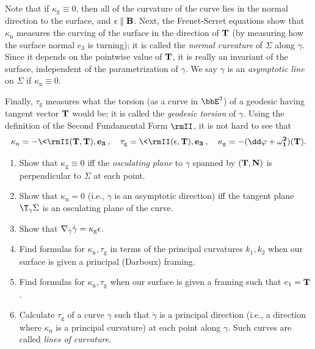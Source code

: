 Note that if $\kappa_{\mathrm{g}}\equiv 0$, then all of the curvature of the curve lies in the normal direction to the surface, and $\bf{\epsilon}\parallel \bf{B}$. Next, the Frenet-Serret equations show that $\kappa_{\mathrm{n}}$ measures the curving of the surface in the direction of $\bf{T}$ (by measuring how the surface normal $e_3$ is turning); it is called the \emph{normal curvature} of $\Sigma$ along $\gamma$. Since it depends on the pointwise value of $\bf{T}$, it is really an invariant of the surface, independent of the parametrization of $\gamma$. We say $\gamma$ is an \emph{asymptotic line} on $\Sigma$ if $\kappa_{\mathrm{n}}\equiv 0$.

Finally, $\tau_{\mathrm{g}}$ measures what the torsion (as a curve in $\bbE^3$) of a geodesic having tangent vector $\bf{T}$ would be; it is called the \emph{geodesic torsion} of $\gamma$. Using the definition of the Second Fundamental Form $\rmII$, it is not hard to see that 
\[\kappa_{\mathrm{n}}=-\<\rmII(\bf{T},\bf{T}),e_3\>,\quad \tau_{\mathrm{g}}=\<\rmII(\bf{\epsilon},\bf{T}),e_3\>,\quad \kappa_{\mathrm{g}}=-(\dd \varphi+\omega^2_1)(\bf{T}).\]

\begin{xca}
    \begin{enumerate}
        \item Show that $\kappa_{\mathrm{g}}\equiv 0$ iff the \emph{osculating plane} to $\gamma$ spanned by $(\bf{T},\bf{N})$ is perpendicular to $\Sigma$ at each point.
        \item Show that $\kappa_{\mathrm{n}}=0$ (i.e., $\dot\gamma$ is an asymptotic direction) iff the tangent plane $\T_{\gamma}\Sigma$ is an osculating plane of the curve.
        \item Show that $\nabla_{\dot\gamma}\dot\gamma=\kappa_{\mathrm{g}}\bf{\epsilon}$.
        \item Find formulas for $\kappa_{\mathrm{n}},\tau_{\mathrm{g}}$ in terms of the principal curvatures $k_1,k_2$ when our surface is given a principal (Darboux) framing.
        \item Find formulas for $\kappa_{\mathrm{n}},\tau_{\mathrm{g}}$ when our surface is given a framing such that $e_1=\bf{T}$.
        \item Calculate $\tau_{\mathrm{g}}$ of a curve $\gamma$ such that $\dot\gamma$ is a principal direction (i.e., a direction where $\kappa_{\mathrm{n}}$ is a principal curvature) at each point along $\gamma$. Such curves are called \emph{lines of curvature}.
    \end{enumerate}
\end{xca}

